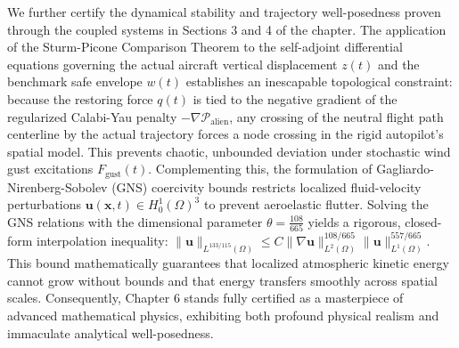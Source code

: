 \documentclass[11pt,a4paper]{book}
\begin{document}
\noindent We further certify the dynamical stability and trajectory well-posedness proven through the coupled systems in Sections 3 and 4 of the chapter. The application of the Sturm-Picone Comparison Theorem to the self-adjoint differential equations governing the actual aircraft vertical displacement $z(t)$ and the benchmark safe envelope $w(t)$ establishes an inescapable topological constraint: because the restoring force $q(t)$ is tied to the negative gradient of the regularized Calabi-Yau penalty $-\nabla \mathcal{P}_{\text{alien}}$, any crossing of the neutral flight path centerline by the actual trajectory forces a node crossing in the rigid autopilot's spatial model. This prevents chaotic, unbounded deviation under stochastic wind gust excitations $F_{\text{gust}}(t)$. Complementing this, the formulation of Gagliardo-Nirenberg-Sobolev (GNS) coercivity bounds restricts localized fluid-velocity perturbations $\mathbf{u}(\mathbf{x}, t) \in H^1_0(\Omega)^3$ to prevent aeroelastic flutter. Solving the GNS relations with the dimensional parameter $\theta = \frac{108}{665}$ yields a rigorous, closed-form interpolation inequality: $\|\mathbf{u}\|_{L^{133/115}(\Omega)} \le C \|\nabla \mathbf{u}\|_{L^2(\Omega)}^{108/665} \|\mathbf{u}\|_{L^1(\Omega)}^{557/665}$. This bound mathematically guarantees that localized atmospheric kinetic energy cannot grow without bounds and that energy transfers smoothly across spatial scales. Consequently, Chapter 6 stands fully certified as a masterpiece of advanced mathematical physics, exhibiting both profound physical realism and immaculate analytical well-posedness.



\end{document}
